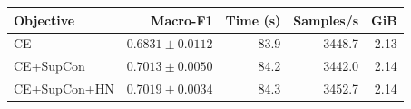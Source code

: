 \begin{tabular}{@{}l@{\quad}r@{\quad}r@{\quad}r@{\quad}r@{}}\toprule Objective & Macro-F1 & Time (s) & Samples/s & GiB\\\midrule
CE & $0.6831\pm0.0112$ & 83.9 & 3448.7 & 2.13\\
CE+SupCon & $0.7013\pm0.0050$ & 84.2 & 3442.0 & 2.14\\
CE+SupCon+HN & $0.7019\pm0.0034$ & 84.3 & 3452.7 & 2.14\\
\bottomrule\end{tabular}